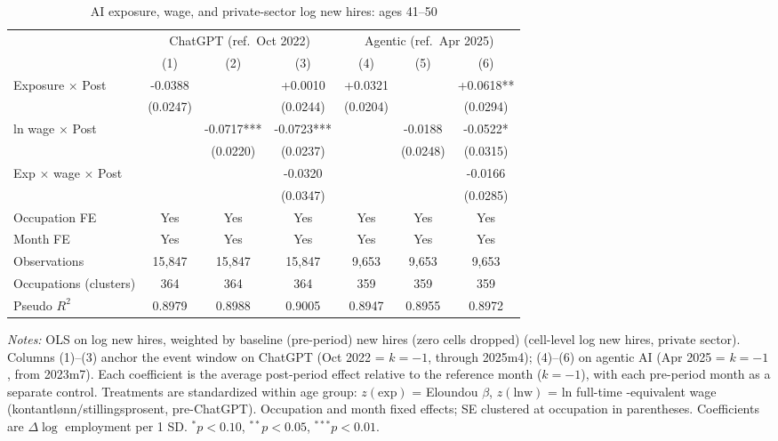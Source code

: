 \begin{table}[htbp]\centering
\caption{AI exposure, wage, and private-sector log new hires: ages 41–50}
\label{tab:ca_did_age3}
\small
\begin{tabular}{lcccccc}
\toprule
 & \multicolumn{3}{c}{ChatGPT (ref.\ Oct 2022)} & \multicolumn{3}{c}{Agentic (ref.\ Apr 2025)} \\
\cmidrule(lr){2-4} \cmidrule(lr){5-7}
 & (1) & (2) & (3) & (4) & (5) & (6) \\
\midrule
Exposure $\times$ Post & -0.0388 &  & +0.0010 & +0.0321 &  & +0.0618** \\
 & (0.0247) &  & (0.0244) & (0.0204) &  & (0.0294) \\
ln wage $\times$ Post &  & -0.0717*** & -0.0723*** &  & -0.0188 & -0.0522* \\
 &  & (0.0220) & (0.0237) &  & (0.0248) & (0.0315) \\
Exp $\times$ wage $\times$ Post &  &  & -0.0320 &  &  & -0.0166 \\
 &  &  & (0.0347) &  &  & (0.0285) \\
\midrule
Occupation FE & Yes & Yes & Yes & Yes & Yes & Yes \\
Month FE & Yes & Yes & Yes & Yes & Yes & Yes \\
Observations & 15,847 & 15,847 & 15,847 & 9,653 & 9,653 & 9,653 \\
Occupations (clusters) & 364 & 364 & 364 & 359 & 359 & 359 \\
Pseudo $R^2$ & 0.8979 & 0.8988 & 0.9005 & 0.8947 & 0.8955 & 0.8972 \\
\bottomrule
\end{tabular}
\begin{minipage}{\linewidth}\vspace{2pt}\footnotesize
\emph{Notes:} OLS on log new hires, weighted by baseline (pre-period) new hires (zero cells dropped) (cell-level log new hires, private sector). Columns (1)--(3) anchor the event window on ChatGPT (Oct 2022 = $k{=}{-}1$, through 2025m4); (4)--(6) on agentic AI (Apr 2025 = $k{=}{-}1$, from 2023m7). Each coefficient is the average post-period effect relative to the reference month ($k{=}{-}1$), with each pre-period month as a separate control. Treatments are standardized within age group: $z(\text{exp})$ = Eloundou $\beta$, $z(\text{lnw})$ = ln full-time -equivalent wage (kontantl\o nn$/$stillingsprosent, pre-ChatGPT). Occupation and month fixed effects; SE clustered at occupation in parentheses. Coefficients are $\Delta\log$ employment per 1 SD. $^{*}p<0.10$, $^{**}p<0.05$, $^{***}p<0.01$.
\end{minipage}
\end{table}